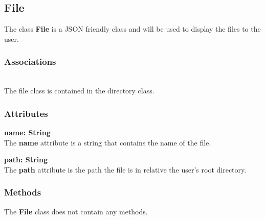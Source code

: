 \subsection{File}
The class \textbf{File} is a JSON friendly class and will be used to display the files to the user.

\subsubsection{Associations}
\textbf{} \\
The file class is contained in the directory class.

\subsubsection{Attributes}
\textbf{name: String} \\
The \textbf{name} attribute is a string that contains the name of the file.

\textbf{path: String} \\
The \textbf{path} attribute is the path the file is in relative the user's
root directory.

\subsubsection{Methods}
The \textbf{File} class does not contain any methods.

